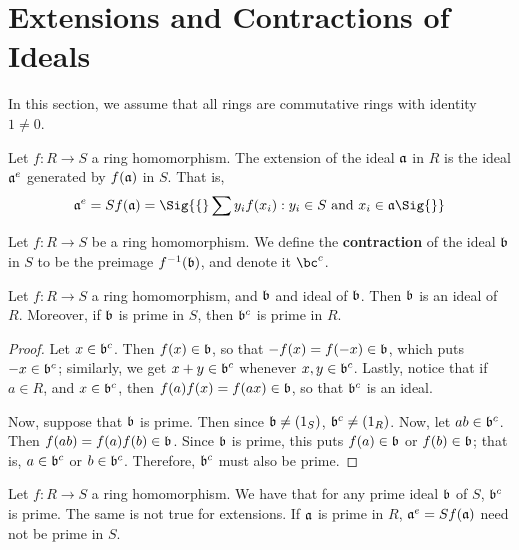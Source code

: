 \section{Extensions and Contractions of Ideals}
\label{section_5.6}

In this section, we assume that all rings are commutative rings with
identity $1 \neq 0$.

\begin{definition}
  Let $f:R \xrightarrow{} S$ a ring homomorphism. The extension of the ideal
  $\af$ in $R$ is the ideal $\af^e$ generated by $f(\af)$ in $S$. That is,
  \begin{equation*}
    \af^e=Sf(\af)=
    \Sig{\{} \sum{y_if(x_i) : y_i \in S \text{ and } x_i \in \af} \Sig{\}}
  \end{equation*}
\end{definition}

\begin{definition}
  Let $f:R \xrightarrow{} S$ be a ring homomorphism. We define the
  \textbf{contraction} of the ideal $\bf$ in $S$ to be the preimage
  $\inv{f}(\bf)$, and denote it $\bc^c$.
\end{definition}

\begin{lemma}\label{lemma_5.6.2}
    Let $f:R \xrightarrow{} S$ a ring homomorphism, and $\bf$ and ideal of
    $\bf$. Then $\bf$ is an ideal of $R$. Moreover, if $\bf$ is prime in $S$,
    then  $\bf^c$ is prime in $R$.
\end{lemma}
\begin{proof}
    Let $x \in \bf^c$. Then  $f(x) \in \bf$, so that $-f(x)=f(-x) \in
    \bf$, which puts $-x \in \bf^c$; similarly, we get $x+y \in \bf^c$ whenever
    $x,y \in \bf^c$. Lastly, notice that if  $a \in R$, and  $x \in \bf^c$, then
     $f(a)f(x)=f(ax) \in \bf$, so that $\bf^c$ is an ideal.

     Now, suppose that  $\bf$ is prime. Then since  $\bf \neq (1_S)$, $\bf^c
     \neq (1_R)$. Now, let $ab \in \bf^c$. Then  $f(ab)=f(a)f(b) \in
     \bf$. Since $\bf$ is prime, this puts  $f(a) \in \bf$ or $f(b) \in
     \bf$; that is, $a \in \bf^c$ or  $b \in \bf^c$. Therefore, $\bf^c$ must
     also be prime.
\end{proof}

\begin{example}\label{example_1.21}
    Let $f:R \xrightarrow{} S$ a ring homomorphism. We have that for any prime
    ideal $\bf$ of $S$, $\bf^c$ is prime. The same is not true for extensions.
    If $\af$ is prime in $R$,  $\af^e=Sf(\af)$ need not be prime in $S$.
\end{example}

